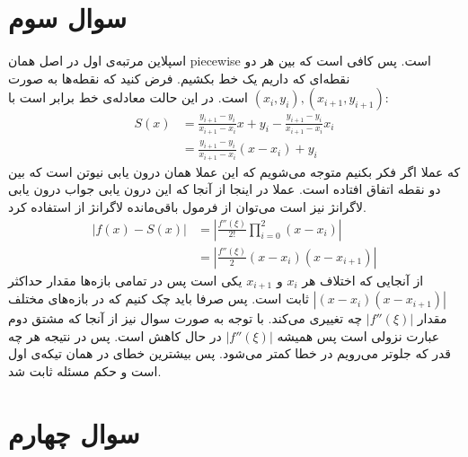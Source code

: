 \documentclass[]{article}
\begin{document}
\section*{سوال سوم}
اسپلاین مرتبه‌ی اول در اصل همان
piecewise
است. پس کافی است که بین هر دو نقطه‌ای که داریم یک خط بکشیم. فرض کنید که نقطه‌ها به صورت
$(x_i, y_i), (x_{i+1}, y_{i+1})$
است. در این حالت معادله‌ی خط برابر است با:
\begin{align*}
    S(x) &= \frac{y_{i+1} - y_i}{x_{i+1} - x_i}x + y_i - \frac{y_{i+1} - y_i}{x_{i+1} - x_i}x_i\\
    &=\frac{y_{i+1} - y_i}{x_{i+1} - x_i}(x-x_i) + y_i
\end{align*}
که عملا اگر فکر بکنیم متوجه می‌شویم که این عملا همان درون یابی نیوتن است که بین دو نقطه
اتفاق افتاده است. عملا در اینجا از آنجا که این درون یابی جواب درون یابی لاگرانژ نیز است می‌توان
از فرمول باقی‌مانده لاگرانژ از
استفاده کرد.
\begin{align*}
    |f(x)-S(x)|&=|\frac {f''(\xi )}{2!}\prod _{i=0}^{2}(x-x_{i})|\\
    &=|\frac{f''(\xi)}{2}(x-x_{i})(x-x_{i+1})|
\end{align*}
از آنجایی که اختلاف هر
$x_i$ و $x_{i+1}$
یکی است پس در تمامی بازه‌ها مقدار حداکثر
$|(x-x_{i})(x-x_{i+1})|$
ثابت است. پس صرفا باید چک کنیم که در بازه‌های مختلف مقدار
$|f''(\xi)|$
چه تغییری می‌کند. با توجه به صورت سوال نیز از آنجا که مشتق دوم عبارت نزولی است پس همیشه
$|f''(\xi)|$
در حال کاهش است. پس در نتیجه هر چه قدر که جلوتر می‌رویم در
خطا کمتر می‌شود. پس بیشترین خطای
در همان تیکه‌ی اول است و حکم مسئله ثابت شد.
\section*{سوال چهارم}
\end{document}
